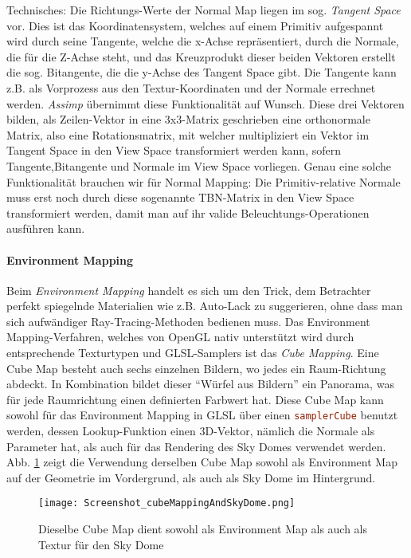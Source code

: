	Technisches: Die Richtungs-Werte der Normal Map liegen im sog. \emph{Tangent Space} vor.
	Dies ist das Koordinatensystem, welches auf einem Primitiv aufgespannt wird durch seine Tangente, welche die
	x-Achse repräsentiert, durch die Normale, die für die Z-Achse steht, und das Kreuzprodukt dieser beiden Vektoren
	erstellt die sog. Bitangente, die die y-Achse des Tangent Space gibt.
	Die Tangente kann z.B. als Vorprozess aus den Textur-Koordinaten und der Normale errechnet werden.
	\emph{Assimp} übernimmt diese Funktionalität auf Wunsch.
	Diese drei Vektoren bilden, als Zeilen-Vektor in eine 3x3-Matrix geschrieben eine orthonormale Matrix,
	also eine Rotationsmatrix, mit welcher multipliziert ein Vektor im Tangent Space in den View Space
	transformiert werden kann, sofern Tangente,Bitangente und Normale im View Space vorliegen.
	Genau eine solche Funktionalität brauchen wir für Normal Mapping: Die Primitiv-relative Normale muss erst noch
	durch diese sogenannte TBN-Matrix in den View Space transformiert werden, damit man auf ihr valide
	Beleuchtungs-Operationen ausführen kann.
	
		
	\paragraph{Environment Mapping}
	Beim \emph{Environment Mapping} handelt es sich um den Trick, dem Betrachter perfekt spiegelnde Materialien 
	wie z.B. Auto-Lack zu suggerieren, ohne dass man sich aufwändiger Ray-Tracing-Methoden bedienen muss.
	Das Environment Mapping-Verfahren, welches von OpenGL nativ unterstützt wird durch entsprechende Texturtypen 
	und GLSL-Samplers ist das \emph{Cube Mapping}. Eine Cube Map besteht auch sechs einzelnen Bildern,
	wo jedes ein Raum-Richtung abdeckt. In Kombination bildet dieser "`Würfel aus Bildern"' ein Panorama,
	was für jede Raumrichtung einen definierten Farbwert hat.
	Diese Cube Map kann sowohl für das Environment Mapping in GLSL über einen 
	\lstinline[language=GLSL]|samplerCube| benutzt werden, dessen Lookup-Funktion einen
	3D-Vektor, nämlich die Normale als Parameter hat, als auch für das Rendering des Sky Domes verwendet werden.
	Abb. \ref{fig:cubeMapSkyDome} zeigt die Verwendung derselben Cube Map sowohl als Environment Map
	auf der Geometrie im Vordergrund, als auch als Sky Dome im Hintergrund.
	
	\begin{figure}[!h]
	\texttt{[image: Screenshot\_cubeMappingAndSkyDome.png]} 
	\caption{ 
		Dieselbe Cube Map dient sowohl als Environment Map als auch als Textur für den Sky Dome
	}
	\label{fig:cubeMapSkyDome}
\end{figure}
	


\clearpage
